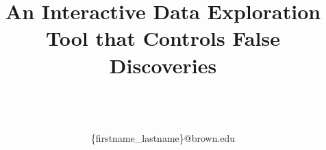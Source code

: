 \documentclass{sig}
\begin{document}
\title{An Interactive Data Exploration Tool that Controls False Discoveries}

\author{
\alignauthor
\vspace*{-30pt}
\begin{tabular}{cccc}
\end{tabular}\\
\vspace{1.5mm}
\\
\vspace{0.75mm}
\{firstname\_lastname\}@brown.edu
}

\date{}
\maketitle

\begin{abstract}

\end{abstract}




%








\balance
\begin{scriptsize}


\end{scriptsize}
\end{document}
